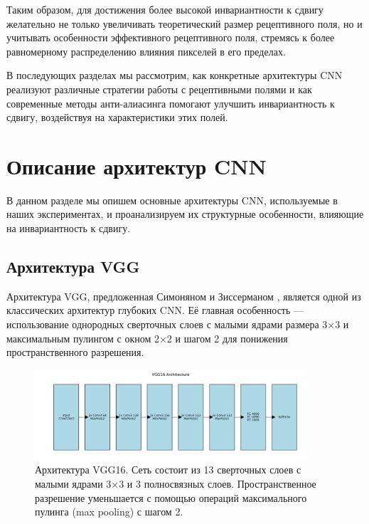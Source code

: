 Таким образом, для достижения более высокой инвариантности к сдвигу желательно не только увеличивать теоретический размер рецептивного поля, но и учитывать особенности эффективного рецептивного поля, стремясь к более равномерному распределению влияния пикселей в его пределах.

В последующих разделах мы рассмотрим, как конкретные архитектуры CNN реализуют различные стратегии работы с рецептивными полями и как современные методы анти-алиасинга помогают улучшить инвариантность к сдвигу, воздействуя на характеристики этих полей.

\section{Описание архитектур CNN}
\label{theory:architectures}

В данном разделе мы опишем основные архитектуры CNN, используемые в наших экспериментах, и проанализируем их структурные особенности, влияющие на инвариантность к сдвигу.

\subsection{Архитектура VGG}
\label{theory:architectures:vgg}

Архитектура VGG, предложенная Симоняном и Зиссерманом \cite{Simonyan2015}, является одной из классических архитектур глубоких CNN. Её главная особенность — использование однородных сверточных слоев с малыми ядрами размера 3×3 и максимальным пулингом с окном 2×2 и шагом 2 для понижения пространственного разрешения.

\begin{figure}[ht]
\centering
\includegraphics[width=0.9\textwidth]{Dissertation/images/vgg16_architecture.png}
\caption{Архитектура VGG16. Сеть состоит из 13 сверточных слоев с малыми ядрами 3×3 и 3 полносвязных слоев. Пространственное разрешение уменьшается с помощью операций максимального пулинга (max pooling) с шагом 2.}
\label{fig:vgg16_architecture}
\end{figure}

